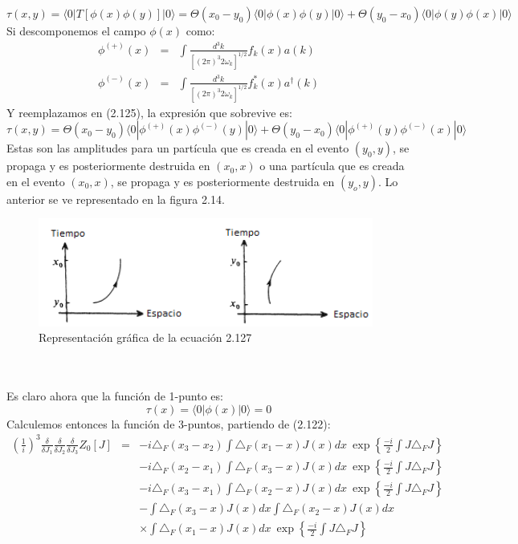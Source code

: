 \begin{equation}
\tau(x,y)=\langle0|T[\phi(x)\phi(y)]|0\rangle=\Theta(x_{0}-y_{0})\langle0|\phi(x)\phi(y)|0\rangle+\Theta(y_{0}-x_{0})\langle0|\phi(y)\phi(x)|0\rangle
\end{equation}          
Si descomponemos el campo $\phi(x)$ como:
\begin{eqnarray}
\phi^{(+)}(x)&=&\int\frac{d^{3}k}{[(2\pi)^{3}2\omega_{k}]^{1/2}}f_{k}(x)a(k)\\
\phi^{(-)}(x)&=&\int\frac{d^{3}k}{[(2\pi)^{3}2\omega_{k}]^{1/2}}f_{k}^*(x)a^\dagger(k)
\end{eqnarray}
Y reemplazamos en (2.125), la expresión que sobrevive es:
\begin{equation}
\tau(x,y)=\Theta(x_{0}-y_{0})\langle0|\phi^{(+)}(x)\phi^{(-)}(y)|0\rangle+\Theta(y_{0}-x_{0})\langle0|\phi^{(+)}(y)\phi^{(-)}(x)|0\rangle
\end{equation}
Estas son las amplitudes para un partícula que es creada en el evento $(y_0,y)$, se propaga y es posteriormente destruida en $(x_0,x)$ o una partícula que es creada en el evento $(x_0,x)$, se propaga y es posteriormente destruida en $(y_o,y)$. Lo anterior se ve representado en la figura 2.14.
\begin{figure}[h!]
\centering
\includegraphics[width=11cm]{Imagenes/Fig15}
\caption[Representación gráfica de la función de 2-puntos ]{Representación gráfica de la ecuación 2.127}
\end{figure}
\\
\\
Es claro ahora que la función de 1-punto es:
\begin{equation}
\tau(x)=\langle 0|\phi(x)|0\rangle=0
\end{equation}
Calculemos entonces la función de 3-puntos, partiendo de (2.122):
\begin{eqnarray}
\nonumber\left(\frac{1}{i}\right)^{3}\frac{\delta}{\delta J_{1}}\frac{\delta}{\delta J_{2}}\frac{\delta}{\delta J_{3}}Z_{0}[J]&=&-i\triangle_{F}(x_{3}-x_{2})\int\triangle_{F}(x_{1}-x)J(x)dx\ \exp\left\{ \frac{-i}{2}\int J\triangle_{F}J\right\}\\
\nonumber && -i\triangle_{F}(x_{2}-x_{1})\int\triangle_{F}(x_{3}-x)J(x)dx\ \exp\left\{ \frac{-i}{2}\int J\triangle_{F}J\right\}\\
\nonumber &&-i\triangle_{F}(x_{3}-x_{1})\int\triangle_{F}(x_{2}-x)J(x)dx\ \exp\left\{ \frac{-i}{2}\int J\triangle_{F}J\right\}\\
\nonumber &&-\int\triangle_{F}(x_{3}-x)J(x)dx\int\triangle_{F}(x_{2}-x)J(x)dx\\
&&\times\int\triangle_{F}(x_{1}-x)J(x)dx\ \exp\left\{ \frac{-i}{2}\int J\triangle_{F}J\right\}
\end{eqnarray}
